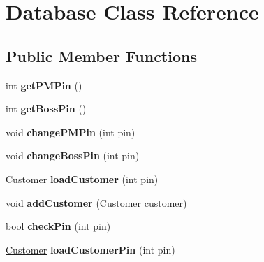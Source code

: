 \hypertarget{classDatabase}{}\section{Database Class Reference}
\label{classDatabase}
\subsection*{Public Member Functions}
\begin{DoxyCompactItemize}
\item 
int {\bfseries get\+P\+M\+Pin} ()\hypertarget{classDatabase_a2f14c252c25a8c19bdb960f5890c4863}{}\label{classDatabase_a2f14c252c25a8c19bdb960f5890c4863}

\item 
int {\bfseries get\+Boss\+Pin} ()\hypertarget{classDatabase_af38c09e944a2511a983787497db1238a}{}\label{classDatabase_af38c09e944a2511a983787497db1238a}

\item 
void {\bfseries change\+P\+M\+Pin} (int pin)\hypertarget{classDatabase_a17c9ecb9cf21244d5b7b1ba0c816ff3b}{}\label{classDatabase_a17c9ecb9cf21244d5b7b1ba0c816ff3b}

\item 
void {\bfseries change\+Boss\+Pin} (int pin)\hypertarget{classDatabase_a9fadea5877eda66ea8fe032400737751}{}\label{classDatabase_a9fadea5877eda66ea8fe032400737751}

\item 
\hyperlink{classCustomer}{Customer} {\bfseries load\+Customer} (int pin)\hypertarget{classDatabase_a246fc85e016526146820912fbd1b5a7a}{}\label{classDatabase_a246fc85e016526146820912fbd1b5a7a}

\item 
void {\bfseries add\+Customer} (\hyperlink{classCustomer}{Customer} customer)\hypertarget{classDatabase_a2afca0cc455a5c12ae2905a8900012e8}{}\label{classDatabase_a2afca0cc455a5c12ae2905a8900012e8}

\item 
bool {\bfseries check\+Pin} (int pin)\hypertarget{classDatabase_a30f198c1fca9a5a9dc4931740a2362a9}{}\label{classDatabase_a30f198c1fca9a5a9dc4931740a2362a9}

\item 
\hyperlink{classCustomer}{Customer} {\bfseries load\+Customer\+Pin} (int pin)\hypertarget{classDatabase_a8152db1c1e7f204ae8a5176f87641478}{}\label{classDatabase_a8152db1c1e7f204ae8a5176f87641478}


\end{DoxyCompactItemize}
